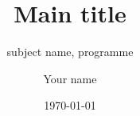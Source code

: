 \documentclass{beamer}
\begin{document}
\title{Main title}
\subtitle{subject name, programme}
\author{Your name}
\date{\today} 


\begin{frame}

  {
    \titlepage
    
  }
  
\end{frame}
\end{document}
